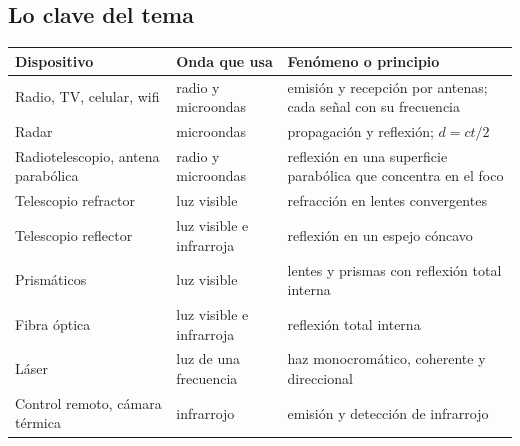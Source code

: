 \subsection{Lo clave del tema}
\begin{center}\small
\begin{tabularx}{\linewidth}{@{}>{\raggedright\arraybackslash\hsize=1.04\hsize}X>{\raggedright\arraybackslash\hsize=0.73\hsize}X>{\raggedright\arraybackslash\hsize=1.22\hsize}X@{}}
\toprule
\textbf{Dispositivo} & \textbf{Onda que usa} & \textbf{Fenómeno o principio} \\
\midrule
Radio, TV, celular, wifi & radio y microondas & emisión y recepción por antenas; cada señal con su frecuencia \\
Radar & microondas & propagación y reflexión; $d = ct/2$ \\
Radiotelescopio, antena parabólica & radio y microondas & reflexión en una superficie parabólica que concentra en el foco \\
Telescopio refractor & luz visible & refracción en lentes convergentes \\
Telescopio reflector & luz visible e infrarroja & reflexión en un espejo cóncavo \\
Prismáticos & luz visible & lentes y prismas con reflexión total interna \\
Fibra óptica & luz visible e infrarroja & reflexión total interna \\
Láser & luz de una frecuencia & haz monocromático, coherente y direccional \\
Control remoto, cámara térmica & infrarrojo & emisión y detección de infrarrojo \\
\bottomrule
\end{tabularx}
\end{center}
 
